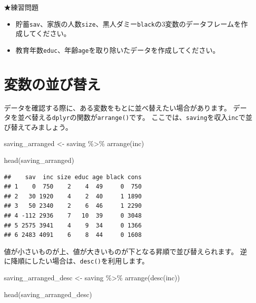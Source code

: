 \documentclass[
]{book}
\newenvironment{Shaded}{\begin{snugshade}}{\end{snugshade}}
\newcommand{\FunctionTok}[1]{\textcolor[rgb]{0.00,0.00,0.00}{#1}}
\newcommand{\NormalTok}[1]{#1}
\newcommand{\OtherTok}[1]{\textcolor[rgb]{0.56,0.35,0.01}{#1}}
\newcommand{\SpecialCharTok}[1]{\textcolor[rgb]{0.00,0.00,0.00}{#1}}
\providecommand{\tightlist}{%
  \setlength{\itemsep}{0pt}\setlength{\parskip}{0pt}}
\begin{document}
★練習問題

\begin{itemize}
\tightlist
\item
  貯蓄\texttt{sav}、家族の人数\texttt{size}、黒人ダミー\texttt{black}の3変数のデータフレームを作成してください。
\item
  教育年数\texttt{educ}、年齢\texttt{age}を取り除いたデータを作成してください。
\end{itemize}

\hypertarget{ux5909ux6570ux306eux4e26ux3073ux66ffux3048}{%
\section{変数の並び替え}\label{ux5909ux6570ux306eux4e26ux3073ux66ffux3048}}

データを確認する際に、ある変数をもとに並べ替えたい場合があります。
データを並べ替える\texttt{dplyr}の関数が\texttt{arrange()}です。
ここでは、\texttt{saving}を収入\texttt{inc}で並び替えてみましょう。

\begin{Shaded}
\begin{Highlighting}[]
\NormalTok{saving\_arranged }\OtherTok{\textless{}{-}}
\NormalTok{  saving }\SpecialCharTok{\%\textgreater{}\%}
    \FunctionTok{arrange}\NormalTok{(inc)}

\FunctionTok{head}\NormalTok{(saving\_arranged)}
\end{Highlighting}
\end{Shaded}

\begin{verbatim}
##    sav  inc size educ age black cons
## 1    0  750    2    4  49     0  750
## 2   30 1920    4    2  40     1 1890
## 3   50 2340    2    6  46     1 2290
## 4 -112 2936    7   10  39     0 3048
## 5 2575 3941    4    9  34     0 1366
## 6 2483 4091    6    8  44     0 1608
\end{verbatim}

値が小さいものが上、値が大きいものが下となる昇順で並び替えられます。
逆に降順にしたい場合は、\texttt{desc()}を利用します。

\begin{Shaded}
\begin{Highlighting}[]
\NormalTok{saving\_arranged\_desc }\OtherTok{\textless{}{-}}
\NormalTok{  saving }\SpecialCharTok{\%\textgreater{}\%}
    \FunctionTok{arrange}\NormalTok{(}\FunctionTok{desc}\NormalTok{(inc))}

\FunctionTok{head}\NormalTok{(saving\_arranged\_desc)}
\end{Highlighting}
\end{Shaded}
\end{document}
